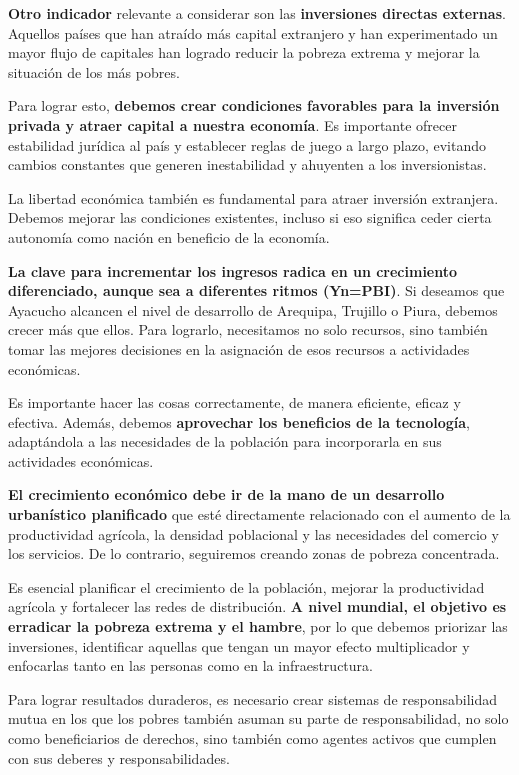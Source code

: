 \documentclass[
  letterpaper,
  DIV=11,
  numbers=noendperiod]{scrartcl}
\begin{document}
\textbf{Otro indicador} relevante a considerar son las
\textbf{inversiones directas externas}. Aquellos países que han atraído
más capital extranjero y han experimentado un mayor flujo de capitales
han logrado reducir la pobreza extrema y mejorar la situación de los más
pobres.

Para lograr esto, \textbf{debemos crear condiciones favorables para la
inversión privada y atraer capital a nuestra economía}. Es importante
ofrecer estabilidad jurídica al país y establecer reglas de juego a
largo plazo, evitando cambios constantes que generen inestabilidad y
ahuyenten a los inversionistas.

La libertad económica también es fundamental para atraer inversión
extranjera. Debemos mejorar las condiciones existentes, incluso si eso
significa ceder cierta autonomía como nación en beneficio de la
economía.

\textbf{La clave para incrementar los ingresos radica en un crecimiento
diferenciado, aunque sea a diferentes ritmos (Yn=PBI)}. Si deseamos que
Ayacucho alcancen el nivel de desarrollo de Arequipa, Trujillo o Piura,
debemos crecer más que ellos. Para lograrlo, necesitamos no solo
recursos, sino también tomar las mejores decisiones en la asignación de
esos recursos a actividades económicas.

Es importante hacer las cosas correctamente, de manera eficiente, eficaz
y efectiva. Además, debemos \textbf{aprovechar los beneficios de la
tecnología}, adaptándola a las necesidades de la población para
incorporarla en sus actividades económicas.

\textbf{El crecimiento económico debe ir de la mano de un desarrollo
urbanístico planificado} que esté directamente relacionado con el
aumento de la productividad agrícola, la densidad poblacional y las
necesidades del comercio y los servicios. De lo contrario, seguiremos
creando zonas de pobreza concentrada.

Es esencial planificar el crecimiento de la población, mejorar la
productividad agrícola y fortalecer las redes de distribución. \textbf{A
nivel mundial, el objetivo es erradicar la pobreza extrema y el hambre},
por lo que debemos priorizar las inversiones, identificar aquellas que
tengan un mayor efecto multiplicador y enfocarlas tanto en las personas
como en la infraestructura.

Para lograr resultados duraderos, es necesario crear sistemas de
responsabilidad mutua en los que los pobres también asuman su parte de
responsabilidad, no solo como beneficiarios de derechos, sino también
como agentes activos que cumplen con sus deberes y responsabilidades.
\end{document}
